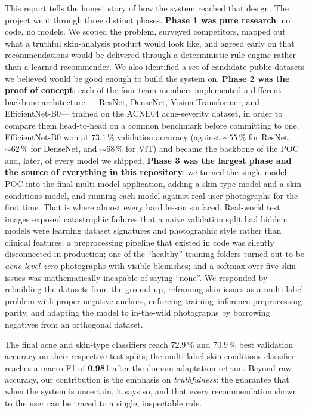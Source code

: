 \documentclass[11pt,a4paper,oneside]{report}
\newcommand{\effnet}{EfficientNet-B0\xspace}
\begin{document}
This report tells the honest story of how the system reached that
design. The project went through three distinct phases. \textbf{Phase 1
was pure research}: no code, no models. We scoped the problem, surveyed
competitors, mapped out what a truthful skin-analysis product would
look like, and agreed early on that recommendations would be delivered
through a deterministic rule engine rather than a learned recommender.
We also identified a set of candidate public datasets we believed
would be good enough to build the system on. \textbf{Phase 2 was the
proof of concept}: each of the four team members implemented a
different backbone architecture --- ResNet, DenseNet, Vision
Transformer, and \effnet --- trained on the ACNE04 acne-severity
dataset, in order to compare them head-to-head on a common benchmark
before committing to one. \effnet won at \(73.1\,\%\) validation
accuracy (against \(\sim 55\,\%\) for ResNet, \(\sim 62\,\%\) for
DenseNet, and \(\sim 68\,\%\) for ViT) and became the backbone of the
POC and, later, of every model we shipped. \textbf{Phase 3 was the
largest phase and the source of everything in this repository}: we
turned the single-model POC into the final multi-model application,
adding a skin-type model and a skin-conditions model, and running each
model against real user photographs for the first time. That is where
almost every hard lesson surfaced. Real-world test images exposed
catastrophic failures that a naive validation split had hidden: models
were learning dataset signatures and photographic style rather than
clinical features; a preprocessing pipeline that existed in code was
silently disconnected in production; one of the ``healthy'' training
folders turned out to be \emph{acne-level-zero} photographs with
visible blemishes; and a softmax over five skin issues was
mathematically incapable of saying ``none''. We responded by rebuilding
the datasets from the ground up, reframing skin issues as a multi-label
problem with proper negative anchors, enforcing training--inference
preprocessing parity, and adapting the model to in-the-wild
photographs by borrowing negatives from an orthogonal dataset.

The final acne and skin-type classifiers reach 72.9\,\% and 70.9\,\%
best validation accuracy on their respective test splits; the
multi-label skin-conditions classifier reaches a macro-F1 of
\textbf{0.981} after the domain-adaptation retrain. Beyond raw
accuracy, our contribution is the emphasis on \emph{truthfulness}: the
guarantee that when the system is uncertain, it says so, and that
every recommendation shown to the user can be traced to a single,
inspectable rule.
\end{document}
